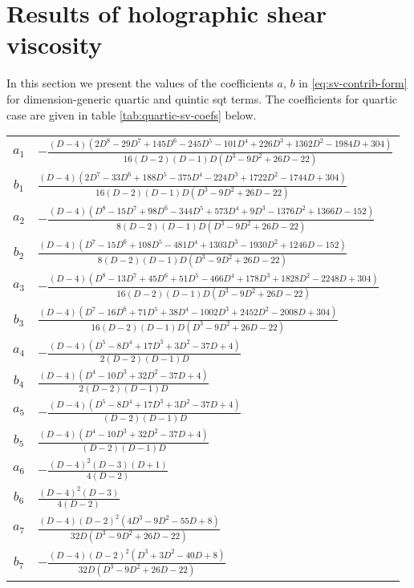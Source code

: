 \documentclass[a4paper,11pt]{article}
\begin{document}
\section{Results of holographic shear viscosity}
In this section we present the values of the coefficients $a$, $b$ in \eqref{eq:sv-contrib-form} for dimension-generic quartic and quintic \ac{sqt} terms. The coefficients for quartic case are given in table \ref{tab:quartic-sv-coefs} below.
\begin{longtable}{|c|l|}
    \hline
    $a_{1}$ & $-\frac{(D-4) \left(2 D^8-29 D^7+145 D^6-245 D^5-101 D^4+226 D^3+1362 D^2-1984 D+304\right)}{16 (D-2) (D-1) D \left(D^3-9 D^2+26 D-22\right)}$ \\$b_{1}$ & $\frac{(D-4) \left(2 D^7-33 D^6+188 D^5-375 D^4-224 D^3+1722 D^2-1744 D+304\right)}{16 (D-2) (D-1) D \left(D^3-9 D^2+26 D-22\right)}$\\
    \hline
    $a_{2}$ & $-\frac{(D-4) \left(D^8-15 D^7+98 D^6-344 D^5+573 D^4+9 D^3-1376 D^2+1366 D-152\right)}{8 (D-2) (D-1) D \left(D^3-9 D^2+26 D-22\right)}$ \\$b_{2}$ & $\frac{(D-4) \left(D^7-15 D^6+108 D^5-481 D^4+1303 D^3-1930 D^2+1246 D-152\right)}{8 (D-2) (D-1) D \left(D^3-9 D^2+26 D-22\right)}$\\
    \hline
    $a_{3}$ & $-\frac{(D-4) \left(D^8-13 D^7+45 D^6+51 D^5-466 D^4+178 D^3+1828 D^2-2248 D+304\right)}{16 (D-2) (D-1) D \left(D^3-9 D^2+26 D-22\right)}$ \\$b_{3}$ & $\frac{(D-4) \left(D^7-16 D^6+71 D^5+38 D^4-1002 D^3+2452 D^2-2008 D+304\right)}{16 (D-2) (D-1) D \left(D^3-9 D^2+26 D-22\right)}$\\
    \hline
    $a_{4}$ & $-\frac{(D-4) \left(D^5-8 D^4+17 D^3+3 D^2-37 D+4\right)}{2 (D-2) (D-1) D}$ \\$b_{4}$ & $\frac{(D-4) \left(D^4-10 D^3+32 D^2-37 D+4\right)}{2 (D-2) (D-1) D}$\\
    \hline
    $a_{5}$ & $-\frac{(D-4) \left(D^5-8 D^4+17 D^3+3 D^2-37 D+4\right)}{(D-2) (D-1) D}$ \\$b_{5}$ & $\frac{(D-4) \left(D^4-10 D^3+32 D^2-37 D+4\right)}{(D-2) (D-1) D}$\\
    \hline
    $a_{6}$ & $-\frac{(D-4)^2 (D-3) (D+1)}{4 (D-2)}$ \\$b_{6}$ & $\frac{(D-4)^2 (D-3)}{4 (D-2)}$\\
    \hline
    $a_{7}$ & $\frac{(D-4) (D-2)^2 \left(4 D^3-9 D^2-55 D+8\right)}{32 D \left(D^3-9 D^2+26 D-22\right)}$ \\$b_{7}$ & $-\frac{(D-4) (D-2)^2 \left(D^3+3 D^2-40 D+8\right)}{32 D \left(D^3-9 D^2+26 D-22\right)}$\\

\end{longtable}
\end{document}
